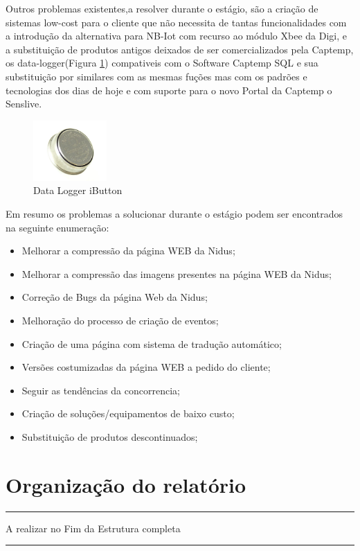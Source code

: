 Outros problemas existentes,a resolver durante o estágio, são a criação de sistemas low-cost para o cliente que não necessita de tantas funcionalidades com a introdução da alternativa para NB-Iot com recurso ao módulo Xbee da Digi, e a substituição de produtos antigos deixados de ser comercializados pela Captemp, os data-logger(Figura \ref{ds1921}) compativeis com o Software Captemp SQL e sua substituição por similares com as mesmas fuções mas com os padrões e tecnologias dos dias de hoje e com suporte para o novo Portal da Captemp o Senslive.
\begin{figure}[htb]
  \centering
  \includegraphics[width=0.25\textwidth]{images/ds1921.jpg}
  \caption{Data Logger iButton}\label{ds1921}
\end{figure}
\par
Em resumo os problemas a solucionar durante o estágio podem ser encontrados na seguinte enumeração:
\begin{itemize}
\item Melhorar a compressão da página WEB da Nidus;
\item Melhorar a compressão das imagens presentes na página WEB da Nidus;
\item Correção de Bugs da página Web da Nidus;
\item Melhoração do processo de criação de eventos;
\item Criação de uma página com sistema de tradução automático;
\item Versões costumizadas da página WEB a pedido do cliente;
\item Seguir as tendências da concorrencia;
\item Criação de soluções/equipamentos de baixo custo;
\item Substituição de produtos descontinuados;
\end{itemize}

\section{Organização do relatório}

{\color{red} \rule{\linewidth}{0.5mm} } 
A realizar no Fim da Estrutura completa\par
{\color{red} \rule{\linewidth}{0.5mm} } 
